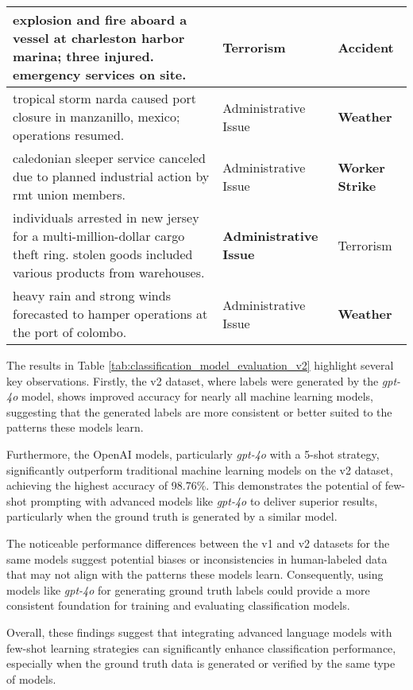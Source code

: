 \begin{table*}[ht]
{\begin{tabularx}{\textwidth}{|>{\raggedright\arraybackslash}X|>{\raggedright\arraybackslash}p{2.3cm}|>{\raggedright\arraybackslash}p{2.3cm}|}
\hline
explosion and fire aboard a vessel at charleston harbor marina; three injured. emergency services on site. & Terrorism & \textbf{Accident} \\
\hline
tropical storm narda caused port closure in manzanillo, mexico; operations resumed. %
& Administrative Issue & \textbf{Weather} \\
\hline
caledonian sleeper service canceled due to planned industrial action by rmt union members. %
& Administrative Issue & \textbf{Worker Strike} \\
\hline
8 individuals arrested in new jersey for a multi-million-dollar cargo theft ring. stolen goods included various products from warehouses. & \textbf{Administrative Issue} & Terrorism \\
\hline
heavy rain and strong winds forecasted to hamper operations at the port of colombo. & Administrative Issue & \textbf{Weather} \\
\hline
\end{tabularx}
}
\label{tab:comparison_results}
\end{table*}

The results in Table \ref{tab:classification_model_evaluation_v2} highlight several key observations. Firstly, the v2 dataset, where labels were generated by the \textit{gpt-4o} model, shows improved accuracy for nearly all machine learning models, suggesting that the generated labels are more consistent or better suited to the patterns these models learn.

Furthermore, the OpenAI models, particularly \textit{gpt-4o} with a 5-shot strategy, significantly outperform traditional machine learning models on the v2 dataset, achieving the highest accuracy of 98.76\%. This demonstrates the potential of few-shot prompting with advanced models like \textit{gpt-4o} to deliver superior results, particularly when the ground truth is generated by a similar model.

The noticeable performance differences between the v1 and v2 datasets for the same models suggest potential biases or inconsistencies in human-labeled data that may not align with the patterns these models learn. Consequently, using models like \textit{gpt-4o} for generating ground truth labels could provide a more consistent foundation for training and evaluating classification models.

Overall, these findings suggest that integrating advanced language models with few-shot learning strategies can significantly enhance classification performance, especially when the ground truth data is generated or verified by the same type of models.


